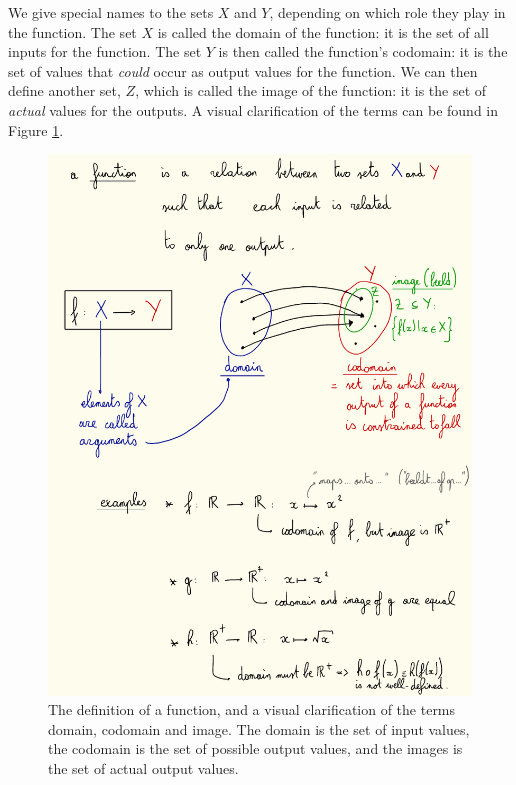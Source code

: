        We give special names to the sets $X$ and $Y$, depending on which role they play in the function. The set $X$ is called the domain of the function: it is the set of all inputs for the function. The set $Y$ is then called the function's codomain: it is the set of values that \emph{could} occur as output values for the function. We can then define another set, $Z$, which is called the image of the function: it is the set of \emph{actual} values for the outputs. A visual clarification of the terms can be found in Figure \ref{fig:functions}. \\
        \begin{figure}[H] \centering
            \includegraphics{images/functions}
            \caption{The definition of a function, and a visual clarification of the terms domain, codomain and image. The domain is the set of input values, the codomain is the set of possible output values, and the images is the set of actual output values.}
            \label{fig:functions}
        \end{figure}

